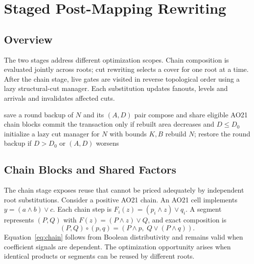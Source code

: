 \section{Staged Post-Mapping Rewriting}

\subsection{Overview}
The two stages address different optimization scopes. Chain composition is evaluated jointly across roots; cut rewriting selects a cover for one root at a time. After the chain stage, live gates are visited in reverse topological order using a lazy structural-cut manager. Each substitution updates fanouts, levels and arrivals and invalidates affected cuts.



\begin{algorithm}[t]
  \footnotesize
  \caption{A round of ePMapping.}\label{alg_epmapping}
  save a round backup of $N$ and its $(A,D)$ pair\;
  compose and share eligible AO21 chain blocks\;
  commit the transaction only if rebuilt area decreases and $D\le D_0$\;
  initialize a lazy cut manager for $N$ with bounds $K,B$\;
  rebuild $N$; restore the round backup if $D>D_0$ or $(A,D)$ worsens\;
\end{algorithm}

\subsection{Chain Blocks and Shared Factors}\label{sec:chain}
The chain stage exposes reuse that cannot be priced adequately by independent root substitutions. Consider a positive AO21 chain. An AO21 cell implements $y=(a\wedge b)\vee c$. Each chain step is $F_i(z)=(p_i\wedge z)\vee q_i$. A segment represents $(P,Q)$ with $F(z)=(P\wedge z)\vee Q$, and exact composition is
\begin{equation}
 (P,Q)\circ(p,q)=(P\wedge p,\;Q\vee(P\wedge q)).\label{eq:chain}
\end{equation}
Equation~\eqref{eq:chain} follows from Boolean distributivity and remains valid when coefficient signals are dependent. The optimization opportunity arises when identical products or segments can be reused by different roots.


